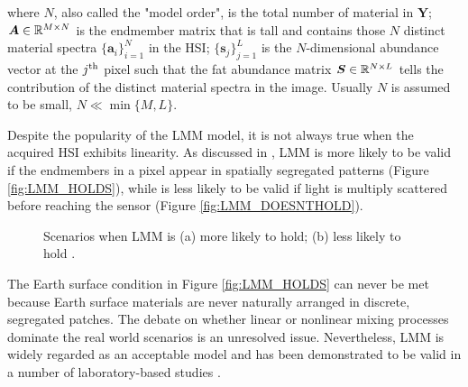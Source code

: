 where $N$, also called the "model order", is the total number of material in
$\bm Y$; $\bm A \in \mathbb R^{M \times N}$ is the endmember matrix that is tall and
contains those $N$ distinct material spectra $\{\bm a_i\}_{i=1}^N$ in the HSI;
$\{\bm s_j\}_{j=1}^L$ is the $N$-dimensional abundance vector at the $j^\text{th}$
pixel such that the fat abundance matrix $\bm S \in \mathbb R^{N \times L}$ tells the
contribution of the distinct material spectra in the image.
Usually $N$ is assumed to be small, \ie $N \ll \min \{M,L\}$.

Despite the popularity of the LMM model, it is not always true when the acquired HSI
exhibits linearity.
As discussed in
\cite{SPECTRAL_UNMIXING},
LMM is more likely to be valid if the endmembers in a pixel appear in
spatially segregated patterns (Figure \ref{fig:LMM_HOLDS}), while is less
likely to be valid if light is multiply scattered before reaching the sensor
(Figure \ref{fig:LMM_DOESNTHOLD}).
\begin{figure}[t]
    \centering
    \caption{Scenarios when LMM is (a) more likely to hold; (b) less likely to hold \cite{SPECTRAL_UNMIXING}.}
\end{figure}
The Earth surface condition in Figure \ref{fig:LMM_HOLDS} can never be met
because Earth surface materials are never naturally arranged in discrete,
segregated patches.
The debate on whether linear or nonlinear mixing processes dominate the real
world scenarios is an unresolved issue.
Nevertheless, LMM is widely regarded as an acceptable model and has been
demonstrated to be valid in a number of laboratory-based studies
\cite{SEMIEMPIRICAL_ANALYSIS_OF_REFLECTANCE_SPECTRA,
      SIMPLE_ALGO_FOR_REMOTE_DETERMINATION_OF_MINERAL_ABUND,
      QUANTITATIVE_ABUND_EST_FROM_BIDIR_REFLECTANCE,
      PHOTO_PHASE_FUNCS_OF_MINERALS}.

